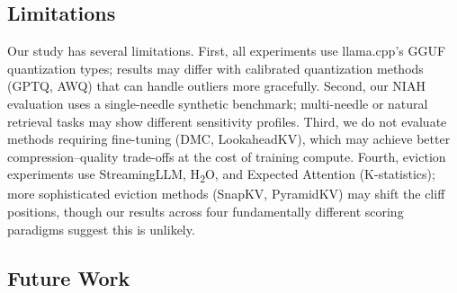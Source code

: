 \subsection{Limitations}

Our study has several limitations. First, all experiments use llama.cpp's GGUF quantization types; results may differ with calibrated quantization methods (GPTQ, AWQ) that can handle outliers more gracefully. Second, our NIAH evaluation uses a single-needle synthetic benchmark; multi-needle or natural retrieval tasks may show different sensitivity profiles. Third, we do not evaluate methods requiring fine-tuning (DMC, LookaheadKV), which may achieve better compression--quality trade-offs at the cost of training compute. Fourth, eviction experiments use StreamingLLM, H\textsubscript{2}O, and Expected Attention (K-statistics); more sophisticated eviction methods (SnapKV, PyramidKV) may shift the cliff positions, though our results across four fundamentally different scoring paradigms suggest this is unlikely.

\subsection{Future Work}

